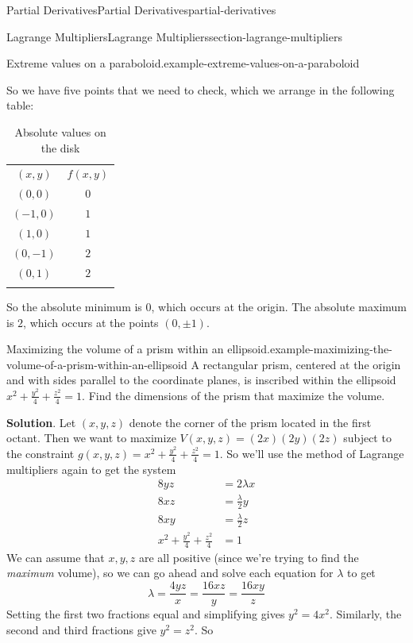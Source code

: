 \documentclass[oneside,10pt,]{book}
\numberwithin{equation}{section}
\newcommand{\hrulethin}  {\noalign{\hrule height 0.04em}}
\newcommand{\hrulethick} {\noalign{\hrule height 0.11em}}
\begin{document}
\begin{chapterptx}{Partial Derivatives}{}{Partial Derivatives}{}{}{partial-derivatives}
\begin{sectionptx}{Lagrange Multipliers}{}{Lagrange Multipliers}{}{}{section-lagrange-multipliers}
\begin{example}{Extreme values on a paraboloid.}{example-extreme-values-on-a-paraboloid}
\par
\hypertarget{p-1455}{}%
So we have five points that we need to check, which we arrange in the following table: \leavevmode%
\begin{table}
\centering
\begin{tabular}{cc}\hrulethick
\((x,y)\)&\(f(x,y)\)\tabularnewline\hrulethin
\((0,0)\)&\(0\)\tabularnewline[0pt]
\((-1,0)\)&\(1\)\tabularnewline[0pt]
\((1,0)\)&\(1\)\tabularnewline[0pt]
\((0,-1)\)&\(2\)\tabularnewline[0pt]
\((0,1)\)&\(2\)\tabularnewline\hrulethick
\end{tabular}
\caption{Absolute values on the disk\label{table-lagrange-example-2}}
\end{table}
 So the absolute minimum is \(0\), which occurs at the origin. The absolute maximum is \(2\), which occurs at the points \((0,\pm1)\).%
\end{example}
\begin{example}{Maximizing the volume of a prism within an ellipsoid.}{example-maximizing-the-volume-of-a-prism-within-an-ellipsoid}%
\hypertarget{p-1456}{}%
A rectangular prism, centered at the origin and with sides parallel to the coordinate planes, is inscribed within the ellipsoid \(x^{2} + \frac{y^{2}}{4} + \frac{z^{2}}{4} = 1\). Find the dimensions of the prism that maximize the volume.%
\par\smallskip%
\noindent\textbf{Solution}.\hypertarget{solution-237}{}\quad%
\hypertarget{p-1457}{}%
Let \((x,y,z)\) denote the corner of the prism located in the first octant. Then we want to maximize \(V(x,y,z) = (2x)(2y)(2z)\) subject to the constraint \(g(x,y,z) = x^{2} + \frac{y^{2}}{4} + \frac{z^{2}}{4} = 1\). So we'll use the method of Lagrange multipliers again to get the system%
\begin{align*}
8yz & = 2\lambda x \\
8xz & = \frac{\lambda}{2}y \\
8xy & = \frac{\lambda}{2}z \\
x^{2} + \frac{y^{2}}{4} + \frac{z^{2}}{4} & =1 
\end{align*}
We can assume that \(x,y,z\) are all positive (since we're trying to find the \emph{maximum} volume), so we can go ahead and solve each equation for \(\lambda\) to get%
\begin{equation*}
\lambda = \frac{4yz}{x} = \frac{16xz}{y} = \frac{16xy}{z}
\end{equation*}
Setting the first two fractions equal and simplifying gives \(y^{2} = 4x^{2}\). Similarly, the second and third fractions give \(y^{2} = z^{2}\). So%

\end{example}
\end{sectionptx}
\end{chapterptx}
\end{document}
